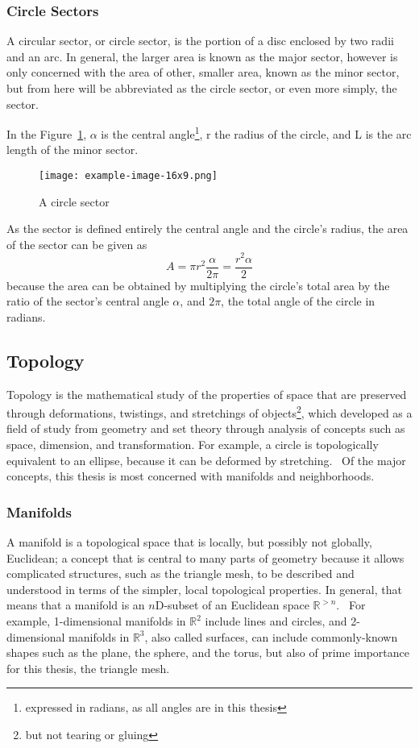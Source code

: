 \subsubsection{Circle Sectors}
A circular sector, or circle sector, is the portion of a disc enclosed by two radii and an arc. In general, the larger area is known as the major sector, however  is only concerned with the area of other, smaller area, known as the minor sector, but from here will be abbreviated as the circle sector, or even more simply, the sector.

In the Figure~\ref{fig:circleSector}, $\alpha$ is the central angle\footnote{expressed in radians, as all angles are in this thesis}, r the radius of the circle, and L is the arc length of the minor sector.
\begin{figure}
\ffigbox
	{\texttt{[image: example-image-16x9.png]}}
	{\caption[Regular Planar and Irregular Non-planar Neighborhoods in $\mathbb{R}^2$]{A circle sector}\label{fig:circleSector}}
\end{figure}

As the sector is defined entirely the central angle and the circle's radius, the area of the sector can be given as
\begin{equation}
	A = \pi r^2\frac{\alpha}{2\pi} = \frac{r^2\alpha}{2}
	\label{eq:areaOfCircleSector}
\end{equation}
because the area can be obtained by multiplying the circle's total area by the ratio of the sector's central angle $\alpha$, and $2\pi$, the total angle of the circle in radians.
%
%
%
\subsection{Topology}
Topology is the mathematical study of the properties of space that are preserved through deformations, twistings, and stretchings of objects\footnote{but not tearing or gluing}, which developed as a field of study from geometry and set theory through analysis of concepts such as space, dimension, and transformation. For example, a circle is topologically equivalent to an ellipse, because it can be deformed by stretching.~\cite{Weisstein19c} Of the major concepts, this thesis is most concerned with manifolds and neighborhoods.
%
\subsubsection{Manifolds}
A manifold is a topological space that is locally, but possibly not globally, Euclidean; a concept that is central to many parts of geometry because it allows complicated structures, such as the triangle mesh, to be described and understood in terms of the simpler, local topological properties. In general, that means that a manifold is an $n$D-subset of an Euclidean space $\mathbb{R}^{>n}$.~\cite[p.~199]{Mara12} For example, 1-dimensional manifolds in $\mathbb{R}^{2}$ include lines and circles, and 2-dimensional manifolds in $\mathbb{R}^{3}$, also called surfaces, can include commonly-known shapes such as the plane, the sphere, and the torus, but also of prime importance for this thesis, the triangle mesh.
%
